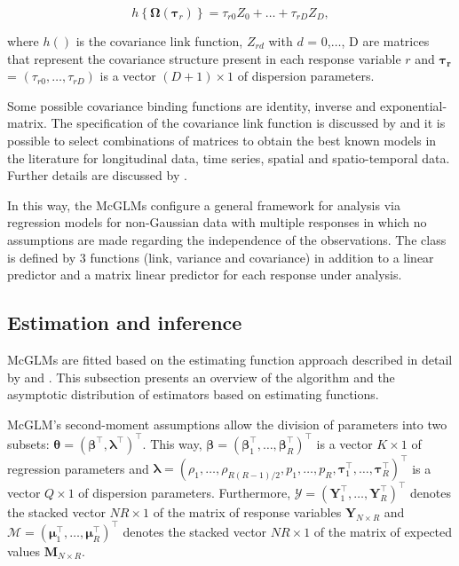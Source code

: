 \documentclass[article]{jss}\usepackage[]{graphicx}\usepackage[]{xcolor}
\begin{document}
$$
h\left \{ \boldsymbol{\Omega}(\boldsymbol{\tau}_r) \right \} = \tau_{r0}Z_0 + \ldots + \tau_{rD}Z_D,
$$

\noindent where $h()$ is the covariance link function, $Z_{rd}$ with $d$ = 0,$\ldots$, D are matrices that represent the covariance structure present in each response variable $r$ and $\boldsymbol{\tau_r}$ = $(\tau_{r0}, \ldots, \tau_{rD})$ is a vector $(D + 1) \times 1$ of dispersion parameters. 

Some possible covariance binding functions are identity, inverse and exponential-matrix. The specification of the covariance link function is discussed by \citet{Pinheiro96} and it is possible to select combinations of matrices to obtain the best known models in the literature for longitudinal data, time series, spatial and spatio-temporal data. Further details are discussed by \citet{Demidenko13}.

In this way, the McGLMs configure a general framework for analysis via regression models for non-Gaussian data with multiple responses in which no assumptions are made regarding the independence of the observations. The class is defined by 3 functions (link, variance and covariance) in addition to a linear predictor and a matrix linear predictor for each response under analysis. 

\subsection{Estimation and inference}\label{sec:inf}

McGLMs are fitted based on the estimating function approach described in detail by \citet{Bonat16} and \citet{jorg04}. This subsection presents an overview of the algorithm and the asymptotic distribution of estimators based on estimating functions.

McGLM's second-moment assumptions allow the division of parameters into two subsets: $\boldsymbol{\theta} = (\boldsymbol{\beta}^{\top}, \boldsymbol{\lambda}^{\top})^{\top}$. This way, $\boldsymbol{\beta} = (\boldsymbol{\beta}_1^\top, \ldots, \boldsymbol{\beta}_R^\top)^\top$ is a vector $K \times 1$ of regression parameters and $\boldsymbol{\lambda} = (\rho_1, \ldots, \rho_{R(R-1)/2}, p_1, \ldots, p_R, \boldsymbol{\tau}_1^\top, \ldots, \boldsymbol{\tau}_R^\top)^\top$ is a vector $Q \times 1$ of dispersion parameters. Furthermore, $\mathcal{Y} = (\boldsymbol{Y}_1^\top, \ldots, \boldsymbol{Y}_R^\top)^\top$ denotes the stacked vector $NR \times 1$ of the matrix of response variables $\boldsymbol{Y}_{N \times R}$ and $\mathcal{M} = (\boldsymbol{\mu}_1^\top, \ldots, \boldsymbol{\mu}_R^\top)^\top$ denotes the stacked vector $NR \times 1$ of the matrix of expected values $\boldsymbol{M}_{N \times R}$.
\end{document}

